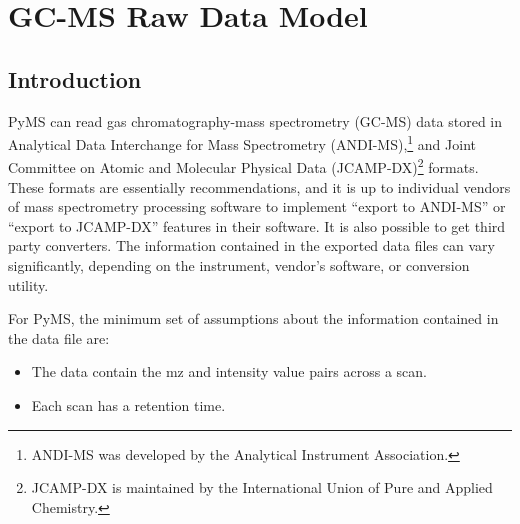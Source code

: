 

\chapter{GC-MS Raw Data Model}

\section{Introduction}

PyMS can read gas chromatography-mass spectrometry (GC-MS) data stored in
Analytical Data Interchange for Mass Spectrometry (ANDI-MS),\footnote{ANDI-MS
was developed by the Analytical Instrument Association.} and Joint Committee on
Atomic and Molecular Physical Data (JCAMP-DX)\footnote{JCAMP-DX is maintained by
the International Union of Pure and Applied Chemistry.} formats. These formats
are essentially recommendations, and it is up to individual vendors of mass
spectrometry processing software to implement ``export to ANDI-MS'' or ``export
to JCAMP-DX'' features in their software. It is also possible to get third party
converters. The information contained in the exported data files
can vary significantly, depending on the instrument, vendor's software, or
conversion utility.

For PyMS, the minimum set of assumptions about the information contained in the
data file are:
\begin{itemize}
    \item The data contain the mz and intensity value pairs across a scan.
    \item Each scan has a retention time.
\end{itemize}

